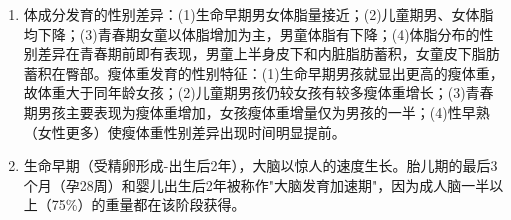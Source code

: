 \begin{enumerate}[leftmargin=*, itemsep=5pt]
    \item 体成分发育的性别差异：(1)生命早期男女体脂量接近；(2)儿童期男、女体脂均下降；(3)青春期女童以体脂增加为主，男童体脂有下降；(4)体脂分布的性别差异在青春期前即有表现，男童上半身皮下和内脏脂肪蓄积，女童皮下脂肪蓄积在臀部。瘦体重发育的性别特征：(1)生命早期男孩就显出更高的瘦体重，故体重大于同年龄女孩；(2)儿童期男孩仍较女孩有较多瘦体重增长；(3)青春期男孩主要表现为瘦体重增加，女孩瘦体重增量仅为男孩的一半；(4)性早熟（女性更多）使瘦体重性别差异出现时间明显提前。

    \item 生命早期（受精卵形成-出生后2年），大脑以惊人的速度生长。胎儿期的最后3个月（孕28周）和婴儿出生后2年被称作"大脑发育加速期"，因为成人脑一半以上（75\%）的重量都在该阶段获得。
\end{enumerate}

\newpage
